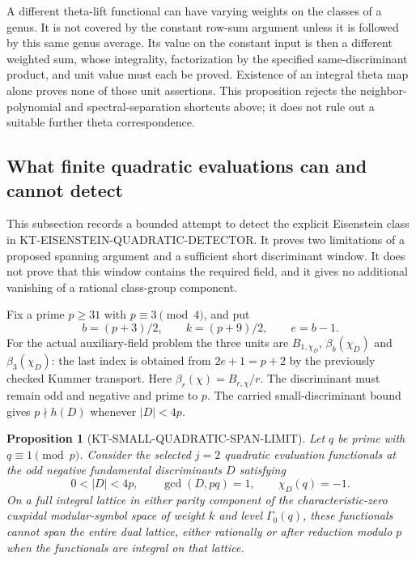 \documentclass[11pt,a4paper]{article}
\newtheorem{proposition}[theorem]{Proposition}
\theoremstyle{definition}
\begin{document}
A different theta-lift functional can have varying weights on the
classes of a genus.  It is not covered by the constant row-sum argument
unless it is followed by this same genus average.  Its value on the
constant input is then a different weighted sum, whose integrality,
factorization by the specified same-discriminant product, and unit
value must each be proved.  Existence of an integral theta map alone
proves none of those unit assertions.  This proposition rejects the
neighbor-polynomial and spectral-separation shortcuts above; it does
not rule out a suitable further theta correspondence.



\subsection{What finite quadratic evaluations can and cannot detect}

This subsection records a bounded attempt to detect the explicit
Eisenstein class in KT-EISENSTEIN-QUADRATIC-DETECTOR.  It proves two
limitations of a proposed spanning argument and a sufficient short
discriminant window.  It does not prove that this window contains the
required field, and it gives no additional vanishing of a rational
class-group component.

Fix a prime $p\geq31$ with $p\equiv3\pmod4$, and put
\[
 b=(p+3)/2,\qquad k=(p+9)/2,\qquad e=b-1.
\]
For the actual auxiliary-field problem the three units are
$B_{1,\chi_D}$, $\beta_b(\chi_D)$ and $\beta_3(\chi_D)$:
the last index is obtained from $2e+1=p+2$ by the previously
checked Kummer transport.  Here $\beta_r(\chi)=B_{r,\chi}/r$.
The discriminant must remain odd and negative and prime to $p$.
The carried small-discriminant bound gives $p\nmid h(D)$ whenever
$|D|<4p$.

\begin{proposition}[KT-SMALL-QUADRATIC-SPAN-LIMIT]
Let $q$ be prime with $q\equiv1\pmod p$.  Consider the selected
$j=2$ quadratic evaluation functionals at the odd negative fundamental
discriminants $D$ satisfying
\[
 0<|D|<4p,\qquad \gcd(D,pq)=1,\qquad \chi_D(q)=-1.
\]
On a full integral lattice in either parity component of the
characteristic-zero cuspidal modular-symbol space of weight $k$ and
level $\Gamma_0(q)$, these functionals cannot span the entire dual
lattice, either rationally or after reduction modulo $p$ when the
functionals are integral on that lattice.
\end{proposition}
\end{document}
